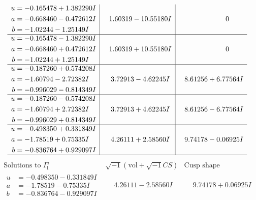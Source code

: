 \documentclass[1p]{elsarticle_modified}
\theoremstyle{definition}
\newcommand{\I}{\sqrt{-1}}
\begin{document}
$$\begin{array}{c|c|c}
\begin{aligned}
u &= -0.165478 + 1.382290 I \\
a &= -0.668460 - 0.472612 I \\
b &= -1.02244 - 1.25149 I\end{aligned}
 & \phantom{-}1.60319 - 10.55180 I & \phantom{-0.000000 } 0 \\ \hline\begin{aligned}
u &= -0.165478 - 1.382290 I \\
a &= -0.668460 + 0.472612 I \\
b &= -1.02244 + 1.25149 I\end{aligned}
 & \phantom{-}1.60319 + 10.55180 I & \phantom{-0.000000 } 0 \\ \hline\begin{aligned}
u &= -0.187260 + 0.574208 I \\
a &= -1.60794 - 2.72382 I \\
b &= -0.996029 - 0.814349 I\end{aligned}
 & \phantom{-}3.72913 - 4.62245 I & \phantom{-}8.61256 + 6.77564 I \\ \hline\begin{aligned}
u &= -0.187260 - 0.574208 I \\
a &= -1.60794 + 2.72382 I \\
b &= -0.996029 + 0.814349 I\end{aligned}
 & \phantom{-}3.72913 + 4.62245 I & \phantom{-}8.61256 - 6.77564 I \\ \hline\begin{aligned}
u &= -0.498350 + 0.331849 I \\
a &= -1.78519 + 0.75335 I \\
b &= -0.836764 + 0.929097 I\end{aligned}
 & \phantom{-}4.26111 + 2.58560 I & \phantom{-}9.74178 - 0.06925 I\\
 \hline 
 \end{array}$$\newpage$$\begin{array}{c|c|c}  
\text{Solutions to }I^u_{1}& \I (\text{vol} + \sqrt{-1}CS) & \text{Cusp shape}\\
 \hline 
\begin{aligned}
u &= -0.498350 - 0.331849 I \\
a &= -1.78519 - 0.75335 I \\
b &= -0.836764 - 0.929097 I\end{aligned}
 & \phantom{-}4.26111 - 2.58560 I & \phantom{-}9.74178 + 0.06925 I \\ \hline\begin{aligned}

\end{aligned}
\end{array}$$
\end{document}
